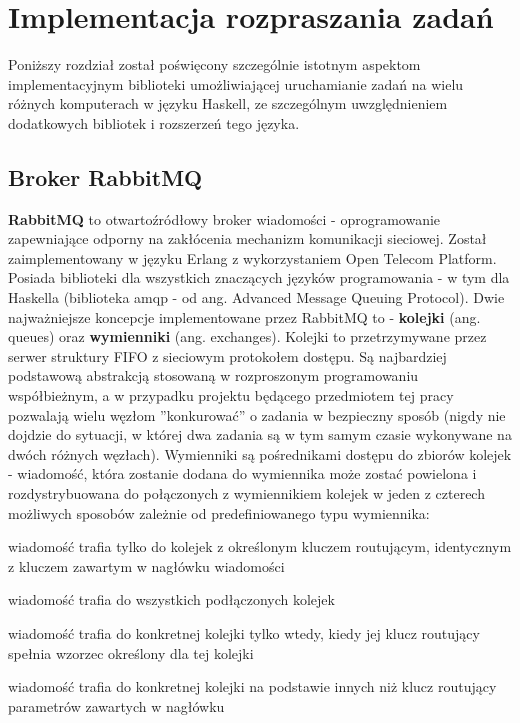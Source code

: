 
\chapter{Implementacja rozpraszania zadań}
\label{chap:impl}
Poniższy rozdział został poświęcony szczególnie istotnym aspektom implementacyjnym biblioteki umożliwiającej uruchamianie zadań na wielu różnych komputerach w języku Haskell, ze szczególnym uwzględnieniem dodatkowych bibliotek i rozszerzeń tego języka.

\section{Broker RabbitMQ}
\textbf{RabbitMQ} to otwartoźródłowy broker wiadomości - oprogramowanie zapewniające odporny na zakłócenia mechanizm komunikacji sieciowej. Został zaimplementowany w języku Erlang z wykorzystaniem Open Telecom Platform. Posiada biblioteki dla wszystkich znaczących języków programowania - w tym dla Haskella (biblioteka amqp - od ang. Advanced Message Queuing Protocol). Dwie najważniejsze koncepcje implementowane przez RabbitMQ to - \textbf{kolejki} (ang. queues) oraz \textbf{wymienniki} (ang. exchanges). Kolejki to przetrzymywane przez serwer struktury FIFO z sieciowym protokołem dostępu. Są najbardziej podstawową abstrakcją stosowaną w rozproszonym programowaniu współbieżnym, a w przypadku projektu będącego przedmiotem tej pracy pozwalają wielu węzłom ''konkurować'' o zadania w bezpieczny sposób (nigdy nie dojdzie do sytuacji, w której dwa zadania są w tym samym czasie wykonywane na dwóch różnych węzłach). Wymienniki są pośrednikami dostępu do zbiorów kolejek - wiadomość, która zostanie dodana do wymiennika może zostać powielona i rozdystrybuowana do połączonych z wymiennikiem kolejek w jeden z czterech możliwych sposobów zależnie od predefiniowanego typu wymiennika:
\begin{description}[align=right,labelwidth=3cm,leftmargin=3cm]
  \item [direct] wiadomość trafia tylko do kolejek z określonym kluczem routującym, identycznym z kluczem zawartym w nagłówku wiadomości
  \item [fanout] wiadomość trafia do wszystkich podłączonych kolejek
  \item [topic] wiadomość trafia do konkretnej kolejki tylko wtedy, kiedy jej klucz routujący spełnia wzorzec określony dla tej kolejki 
  \item [headers] wiadomość trafia do konkretnej kolejki na podstawie innych niż klucz routujący parametrów zawartych w nagłówku
\end{description}

